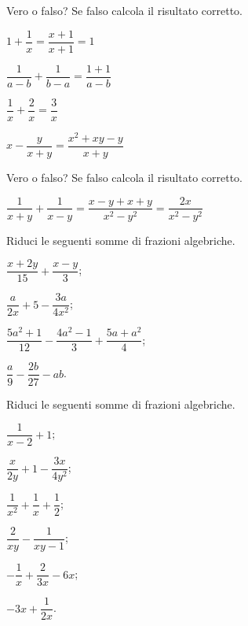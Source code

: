 \begin{esercizio}
\label{ese:19.23}
Vero o falso? Se falso calcola il risultato corretto.
\begin{multicols}{2}
\TabPositions{4cm}
\begin{enumeratea}
 \item $1+\dfrac{1}{x}=\dfrac{x+1}{x+1}=1$ \tab\boxV\quad\boxF
 \item $\dfrac{1}{a-b}+\dfrac{1}{b-a}=\dfrac{1+1}{a-b}$ \tab\boxV\quad\boxF
 \item $\dfrac{1}{x}+\dfrac{2}{x}=\dfrac{3}{x}$ \tab\boxV\quad\boxF
 \item $x-\dfrac{y}{x+y}=\dfrac{x^{2}+xy-y}{x+y}$ \tab\boxV\quad\boxF
\end{enumeratea}
\end{multicols}
\end{esercizio}

\begin{esercizio}
\label{ese:19.24}
Vero o falso? Se falso calcola il risultato corretto.
\TabPositions{8cm}

$\dfrac{1}{x+y}+\dfrac{1}{x-y}=\dfrac{x-y+x+y}{x^{2}-y^{2}}=\dfrac{2x}{x^{2}-y^{2}}$ \tab\boxV\quad\boxF
\end{esercizio}
\begin{esercizio}
\label{ese:19.25}
Riduci le seguenti somme di frazioni algebriche.
\begin{multicols}{2}
\begin{enumeratea}
 \item $\dfrac{x+2y}{15}+\dfrac{x-y}{3}$;
 \item $\dfrac{a}{2x}+5-\dfrac{3a}{4x^{2}}$;
 \item $\dfrac{5a^{2}+1}{12}-\dfrac{4a^{2}-1}{3}+\dfrac{5a+a^{2}}{4}$;
 \item $\dfrac{a}{9}-\dfrac{2b}{27}-ab$.
\end{enumeratea}
\end{multicols}
\end{esercizio}

\begin{esercizio}
\label{ese:19.26}
Riduci le seguenti somme di frazioni algebriche.
\begin{multicols}{3}
\begin{enumeratea}
 \item $\dfrac{1}{x-2}+1$;
 \item $\dfrac{x}{2y}+1-\dfrac{3x}{4y^{2}}$;
 \item $\dfrac{1}{x^{2}}+\dfrac{1}{x}+\dfrac{1}{2}$;
 \item $\dfrac{2}{xy}-\dfrac{1}{xy-1}$;
 \item $-{\dfrac{1}{x}}+\dfrac{2}{3x}-6x$;
 \item $-3x+\dfrac{1}{2x}$.
\end{enumeratea}
\end{multicols}
\end{esercizio}

